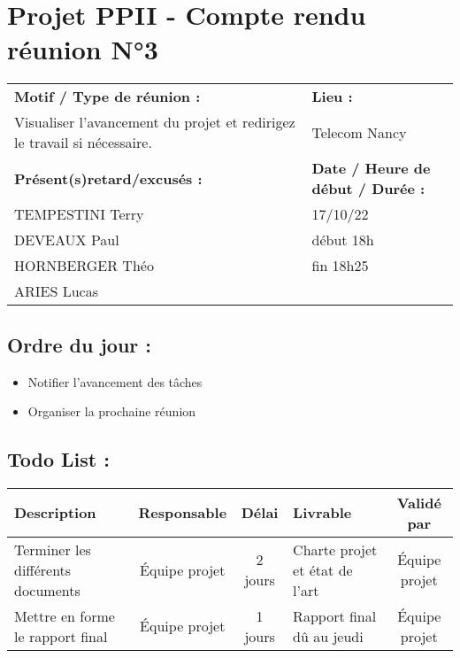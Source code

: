 \documentclass{report}
\begin{document}
\section*{Projet PPII - Compte rendu réunion N°3}
\begin{tabular}{|p{7cm}|p{6cm}|}
    \hline
    \textbf{Motif / Type de réunion :}
    & \textbf{Lieu :}
    \\
    Visualiser l'avancement du projet et redirigez le travail si nécessaire.
    & 
    Telecom Nancy
    \\ \hline
    \textbf{Présent(s)retard/excusés :}
    &
    \textbf{Date / Heure de début / Durée :}
    \\ 
    TEMPESTINI Terry &  17/10/22\\  
    DEVEAUX Paul & début 18h\\
    HORNBERGER Théo & fin 18h25\\
    ARIES Lucas & 
    \\ \hline
\end{tabular}

\subsection*{Ordre du jour :}
\begin{itemize}
    \item{Notifier l'avancement des tâches}
    \item{Organiser la prochaine réunion}
\end{itemize}

\subsection*{Todo List :}
\begin{tabular}{|p{3.5cm}|c|c|p{4.5cm}|c|}
    \hline 
    Description & Responsable & Délai & Livrable & Validé par 
    \\ \hline
    Terminer les différents documents & Équipe projet & 2 jours & Charte projet et état de l'art & Équipe projet
    \\ \hline
    Mettre en forme le rapport final & Équipe projet & 1 jours & Rapport final dû au jeudi & Équipe projet
    \\ \hline
\end{tabular}
\newpage
\end{document}
